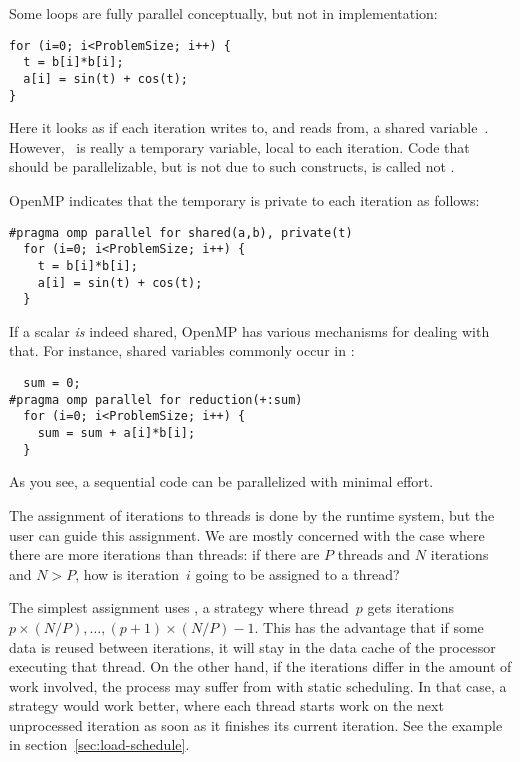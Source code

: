 Some loops are fully parallel conceptually, but not in implementation:
\lstset{language=C}
\begin{lstlisting}
for (i=0; i<ProblemSize; i++) {
  t = b[i]*b[i];
  a[i] = sin(t) + cos(t);
}
\end{lstlisting}
Here it looks as if each iteration writes to, and reads from, a shared
variable~. However, ~is really a temporary variable,
local to each iteration. Code that should be parallelizable, but is
not due to such constructs, is called not .

OpenMP indicates that the temporary is private to each iteration as follows:
\lstset{language=C}
\begin{lstlisting}
#pragma omp parallel for shared(a,b), private(t)
  for (i=0; i<ProblemSize; i++) {
    t = b[i]*b[i];
    a[i] = sin(t) + cos(t);
  }
\end{lstlisting}
If a scalar \emph{is} indeed shared, OpenMP has various mechanisms for
dealing with that. For instance, shared variables commonly occur in
:
\lstset{language=C}
\begin{lstlisting}
  sum = 0;
#pragma omp parallel for reduction(+:sum)
  for (i=0; i<ProblemSize; i++) {
    sum = sum + a[i]*b[i];
  }
\end{lstlisting}
As you see, a sequential code can be parallelized with minimal effort.

The assignment of iterations to threads is done by the runtime system,
but the user can guide this assignment. We are mostly concerned with
the case where there are more iterations than threads: if there are
$P$ threads and $N$ iterations and $N>P$, how is iteration~$i$ going
to be assigned to a thread?

The simplest assignment uses , a
 strategy where thread~$p$ gets iterations
$p\times(N/P),\ldots,(p+1)\times (N/P)-1$.
This has the advantage that if some data is
reused between iterations, it will stay in the data cache of the
processor executing that thread. On the other hand, if the iterations
differ in the amount of work involved, the process may suffer from
 with static scheduling. In that case, a
 strategy would work better, where each
thread starts work on the next unprocessed iteration as soon as it
finishes its current iteration. See the example in section~\ref{sec:load-schedule}.

